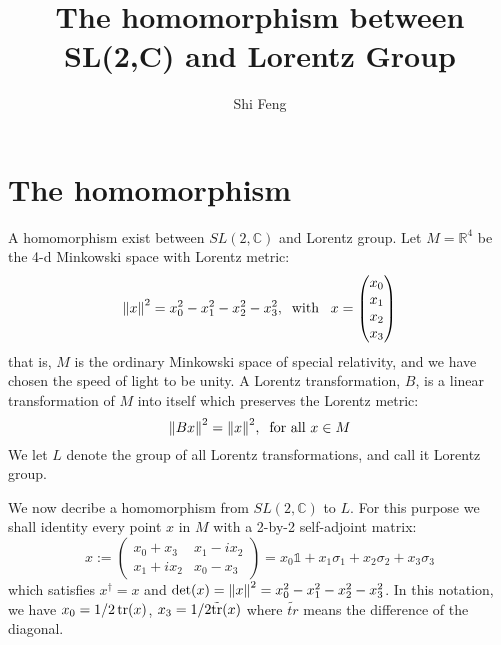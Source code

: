 \documentclass[11pt]{article}
\title{The homomorphism between SL(2,C) and Lorentz Group}
\author{Shi Feng}
\date{}
\theoremstyle{remark}
\theoremstyle{definition}
\numberwithin{thm}{section}
\begin{document}
\maketitle
\section{The homomorphism}
A homomorphism exist between $SL(2,\mathbb{C})$ and Lorentz group. Let  $M = \mathbb{R}^4$ be the 4-d Minkowski space with Lorentz metric:
\begin{equation}
	\norm{x}^2 = x_0^2 - x_1^2 - x_2^2 - x_3^2,\;\;\text{with}\;\;\; x = 
	\begin{pmatrix}
		x_0 \\ x_1 \\ x_2 \\ x_3
	\end{pmatrix}
\end{equation}
that is, $M$ is the ordinary Minkowski space of special relativity, and we have chosen the speed of light to be unity. A Lorentz transformation, $B$, is a linear transformation of $M$ into itself which preserves the Lorentz metric:
\begin{equation}
	\norm{Bx}^2 = \norm{x}^2,\;\;\text{for all }x \in M
\end{equation}
We let $L$ denote the group of all Lorentz transformations, and call it Lorentz group.

We now decribe a homomorphism from  $SL(2,\mathbb{C})$ to $L$. For this purpose we shall identity every point  $x$ in $M$ with a 2-by-2 self-adjoint matrix:
\begin{equation}
	x := 
	\begin{pmatrix}
		x_0 + x_3 & x_1 - ix_2 \\
		x_1 + ix_2 & x_0 - x_3
	\end{pmatrix}
	= x_0 \mathbb{1} + x_1 \sigma_1 + x_2 \sigma_2 + x_3 \sigma_3
\end{equation}
which satisfies $x^\dagger = x$ and $\det(x) = \norm{x}^2 = x_0^2 - x_1^2 - x_2^2 - x_3^2$. In this notation, we have  $x_0 = 1/2\tr(x)$,  $x_3 = 1/2\tilde{\tr}(x)$ where  $\tilde{tr}$ means the difference of the diagonal.
\end{document}
